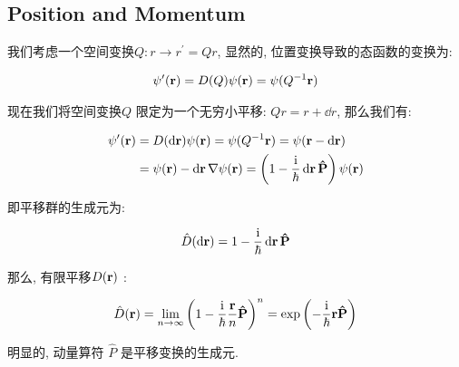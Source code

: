 \subsection{Position and Momentum}

我们考虑一个空间变换$Q:r\to r^\prime = Qr$, 显然的, 位置变换导致的态函数的变换为:

 \begin{equation}
  \begin{aligned}
    \psi^{\prime}({\bf r}) = D(Q) \psi({\bf r}) = \psi(Q^{-1} {\bf r})
  \end{aligned}
\end{equation}

现在我们将空间变换$Q$ 限定为一个无穷小平移: $Qr = r+\dd r$, 那么我们有:

\begin{equation}
  \begin{aligned}
    \psi^{\prime}({\bf r}) &= D(\dd {\bf r}) \psi({\bf r}) = \psi(Q^{-1} {\bf r}) = \psi({\bf r} - \dd {\bf r}) \\
    &= \psi({\bf r}) - \dd {\bf r} \nabla \psi({\bf r}) = \left(1 - \frac{{\rm i}}{\hbar}\dd {\bf r} {\bf \hat{P}}\right)\psi({\bf r})
  \end{aligned}
\end{equation}

即平移群的生成元为:

\begin{equation}
  \begin{aligned}
    \hat{D}(\dd{\bf r}) = 1 - \frac{{\rm i}}{\hbar}\dd {\bf r} {\bf \hat{P}}
  \end{aligned}
\end{equation}

那么, 有限平移$D({\bf r})$ :

\begin{equation}
  \begin{aligned}
    \hat{D}({\bf r}) = \lim_{n\to \infty} \left(1 - \frac{{\rm i}}{\hbar} \frac{{\bf r}}{n} {\bf \hat{P}}\right)^{n} = \exp \left(- \frac{{\rm i}}{\hbar}{\bf r}{\bf \hat{P}}\right)
  \end{aligned}
\end{equation}

明显的, 动量算符 $\hat{P}$ 是平移变换的生成元.
